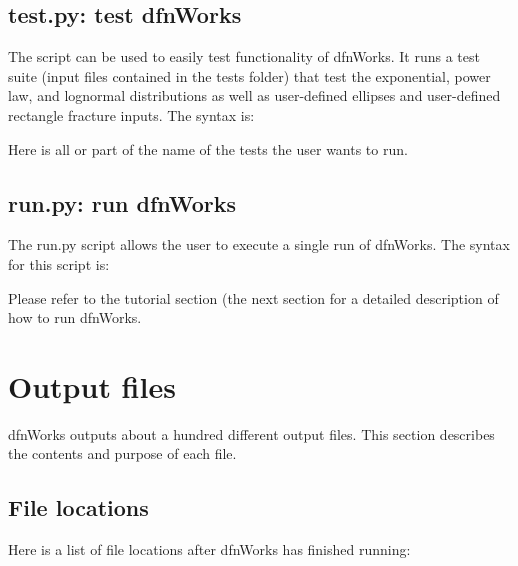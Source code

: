 \documentclass[letterpaper,10pt,english]{sphinxmanual}
\begin{document}
\section{test.py: test dfnWorks}
\label{\detokenize{scripts:test-py-test-dfnworks}}
The  script can be used to easily test functionality of dfnWorks. It runs a test suite (input files contained in the tests folder) that test the exponential, power law, and lognormal distributions as well as user-defined ellipses and user-defined rectangle fracture inputs. The syntax is:


Here  is all or part of the name of the tests the user wants to run.


\section{run.py: run dfnWorks}
\label{\detokenize{scripts:run-py-run-dfnworks}}
The run.py script allows the user to execute a single run of dfnWorks. The syntax for this script is:


Please refer to the tutorial section (the next section for a detailed description of how to run dfnWorks.


\chapter{Output files}
\label{\detokenize{output:output-chapter}}\label{\detokenize{output::doc}}\label{\detokenize{output:output-files}}
dfnWorks outputs about a hundred different output files. This section describes the contents and purpose of each file.


\section{File locations}
\label{\detokenize{output:file-locations}}
Here is a list of file locations after dfnWorks has finished running:
\end{document}
